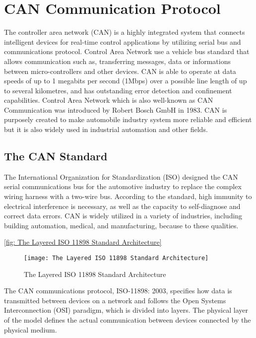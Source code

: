 
\section{CAN Communication Protocol}

The controller area network (CAN) is a highly integrated system that connects intelligent devices for  real-time control applications by utilizing serial bus and communications protocol. Control Area Network use a vehicle bus standard that allows communication such as, transferring messages, data or informations between micro-controllers and other devices. CAN is able to operate at data speeds of up to 1 megabits per second (1Mbps) over a possible line length of up to several kilometres, and has outstanding error detection and confinement capabilities. Control Area Network which is also well-known as CAN Communication was introduced by Robert Bosch GmbH in 1983. CAN is purposely created to make automobile industry system more reliable and efficient but it is also widely used in industrial automation and other fields. 
\subsection{The CAN Standard }

The International Organization for Standardization (ISO) designed the CAN serial communications bus for the automotive industry to replace the complex wiring harness with a two-wire bus. According to the standard, high immunity to electrical interference is necessary, as well as the capacity to self-diagnose and correct data errors. CAN is widely utilized in a variety of industries, including building automation, medical, and manufacturing, because to these qualities.

\ref{fig: The Layered ISO 11898 Standard Architecture}
\begin{figure}[h]
    \centering
    \texttt{[image: The Layered ISO 11898 Standard Architecture]}
    \caption{The Layered ISO 11898 Standard Architecture \cite{b5}}
    \label{fig:The Layered ISO 11898 Standard Architecture}
\end{figure}

The CAN communications protocol, ISO-11898: 2003, specifies how data is transmitted between devices on a network and follows the Open Systems Interconnection (OSI) paradigm, which is divided into layers. The physical layer of the model defines the actual communication between devices connected by the physical medium. 

